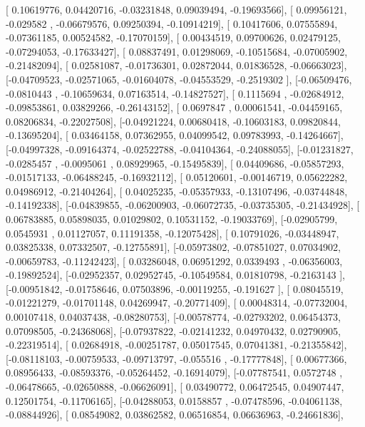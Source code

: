 \documentclass{article}
\begin{document}
       [ 0.10619776,  0.04420716, -0.03231848,  0.09039494, -0.19693566],
       [ 0.09956121, -0.029582  , -0.06679576,  0.09250394, -0.10914219],
       [ 0.10417606,  0.07555894, -0.07361185,  0.00524582, -0.17070159],
       [ 0.00434519,  0.09700626,  0.02479125, -0.07294053, -0.17633427],
       [ 0.08837491,  0.01298069, -0.10515684, -0.07005902, -0.21482094],
       [ 0.02581087, -0.01736301,  0.02872044,  0.01836528, -0.06663023],
       [-0.04709523, -0.02571065, -0.01604078, -0.04553529, -0.2519302 ],
       [-0.06509476, -0.0810443 , -0.10659634,  0.07163514, -0.14827527],
       [ 0.1115694 , -0.02684912, -0.09853861,  0.03829266, -0.26143152],
       [ 0.0697847 ,  0.00061541, -0.04459165,  0.08206834, -0.22027508],
       [-0.04921224,  0.00680418, -0.10603183,  0.09820844, -0.13695204],
       [ 0.03464158,  0.07362955,  0.04099542,  0.09783993, -0.14264667],
       [-0.04997328, -0.09164374, -0.02522788, -0.04104364, -0.24088055],
       [-0.01231827, -0.0285457 , -0.0095061 ,  0.08929965, -0.15495839],
       [ 0.04409686, -0.05857293, -0.01517133, -0.06488245, -0.16932112],
       [ 0.05120601, -0.00146719,  0.05622282,  0.04986912, -0.21404264],
       [ 0.04025235, -0.05357933, -0.13107496, -0.03744848, -0.14192338],
       [-0.04839855, -0.06200903, -0.06072735, -0.03735305, -0.21434928],
       [ 0.06783885,  0.05898035,  0.01029802,  0.10531152, -0.19033769],
       [-0.02905799,  0.0545931 ,  0.01127057,  0.11191358, -0.12075428],
       [ 0.10791026, -0.03448947,  0.03825338,  0.07332507, -0.12755891],
       [-0.05973802, -0.07851027,  0.07034902, -0.00659783, -0.11242423],
       [ 0.03286048,  0.06951292,  0.0339493 , -0.06356003, -0.19892524],
       [-0.02952357,  0.02952745, -0.10549584,  0.01810798, -0.2163143 ],
       [-0.00951842, -0.01758646,  0.07503896, -0.00119255, -0.191627  ],
       [ 0.08045519, -0.01221279, -0.01701148,  0.04269947, -0.20771409],
       [ 0.00048314, -0.07732004,  0.00107418,  0.04037438, -0.08280753],
       [-0.00578774, -0.02793202,  0.06454373,  0.07098505, -0.24368068],
       [-0.07937822, -0.02141232,  0.04970432,  0.02790905, -0.22319514],
       [ 0.02684918, -0.00251787,  0.05017545,  0.07041381, -0.21355842],
       [-0.08118103, -0.00759533, -0.09713797, -0.055516  , -0.17777848],
       [ 0.00677366,  0.08956433, -0.08593376, -0.05264452, -0.16914079],
       [-0.07787541,  0.0572748 , -0.06478665, -0.02650888, -0.06626091],
       [ 0.03490772,  0.06472545,  0.04907447,  0.12501754, -0.11706165],
       [-0.04288053,  0.0158857 , -0.07478596, -0.04061138, -0.08844926],
       [ 0.08549082,  0.03862582,  0.06516854,  0.06636963, -0.24661836],
\end{document}
